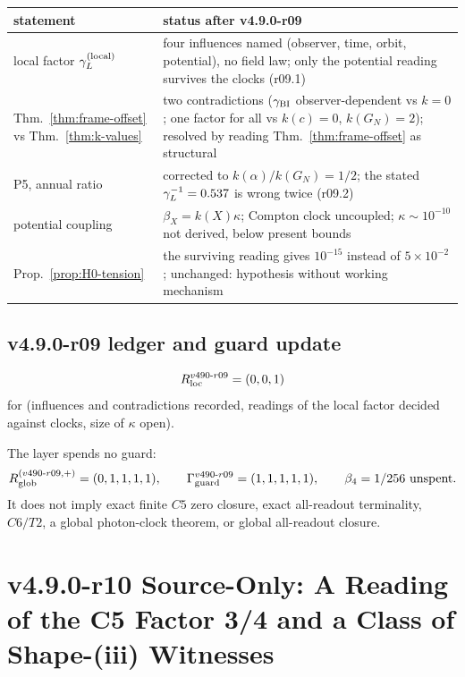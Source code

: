 \begin{center}
\small
\begin{tabular}{@{}>{\raggedright\arraybackslash}p{}>{\raggedright\arraybackslash}p{}@{}}
\toprule
statement & status after v4.9.0-r09\\
\midrule
local factor \(\gamma_L^{(\mathrm{local})}\) & four influences named (observer, time, orbit, potential), no field law; only the potential reading survives the clocks (r09.1)\\
Thm.~\ref{thm:frame-offset} vs Thm.~\ref{thm:k-values} & two contradictions (\(\gamma_{\mathrm{BI}}\) observer-dependent vs \(k=0\); one factor for all vs \(k(c)=0\), \(k(G_N)=2\)); resolved by reading Thm.~\ref{thm:frame-offset} as structural\\
P5, annual ratio & corrected to \(k(\alpha)/k(G_N)=1/2\); the stated \(\gamma_L^{-1}=0.537\) is wrong twice (r09.2)\\
potential coupling & \(\beta_X=k(X)\kappa\); Compton clock uncoupled; \(\kappa\sim10^{-10}\) not derived, below present bounds\\
Prop.~\ref{prop:H0-tension} & the surviving reading gives \(10^{-15}\) instead of \(5\times10^{-2}\); unchanged: hypothesis without working mechanism\\
\bottomrule
\end{tabular}
\end{center}

\subsection*{v4.9.0-r09 ledger and guard update}
\label{subsec:v490-r09-ledger-guard}

\[
R_{\rm loc}^{v490\text{-}r09}=(0,0,1)
\]
for (influences and contradictions recorded, readings of the local factor decided against clocks, size of \(\kappa\) open).

The layer spends no guard:
\[
R_{\rm glob}^{(v490\text{-}r09,+)}=(0,1,1,1,1),
\qquad
\Gamma_{\rm guard}^{v490\text{-}r09}=(1,1,1,1,1),
\qquad
\beta_4=1/256\ \text{unspent}.
\]
It does not imply exact finite \(C5\) zero closure, exact all-readout terminality,
\(C6/T2\), a global photon-clock theorem, or global all-readout closure.

\clearpage
\section*{v4.9.0-r10 Source-Only: A Reading of the C5 Factor 3/4 and a Class of Shape-(iii) Witnesses}
\label{sec:v490-r10-c5-factor-shape-three}

